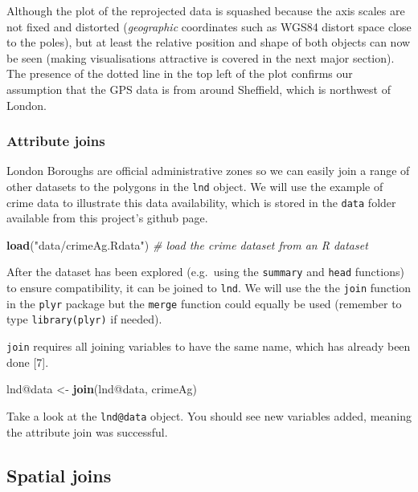 \documentclass[]{article}
\newenvironment{Shaded}{}{}
\newcommand{\KeywordTok}[1]{\textcolor[rgb]{0.00,0.44,0.13}{\textbf{{#1}}}}
\newcommand{\StringTok}[1]{\textcolor[rgb]{0.25,0.44,0.63}{{#1}}}
\newcommand{\CommentTok}[1]{\textcolor[rgb]{0.38,0.63,0.69}{\textit{{#1}}}}
\newcommand{\NormalTok}[1]{{#1}}
\begin{document}
Although the plot of the reprojected data is squashed because the axis
scales are not fixed and distorted (\emph{geographic} coordinates such
as WGS84 distort space close to the poles), but at least the relative
position and shape of both objects can now be seen (making
visualisations attractive is covered in the next major section). The
presence of the dotted line in the top left of the plot confirms our
assumption that the GPS data is from around Sheffield, which is
northwest of London.

\subsubsection{Attribute joins}

London Boroughs are official administrative zones so we can easily join
a range of other datasets to the polygons in the \texttt{lnd} object. We
will use the example of crime data to illustrate this data availability,
which is stored in the \texttt{data} folder available from this
project's github page.

\begin{Shaded}
\begin{Highlighting}[]
\KeywordTok{load}\NormalTok{(}\StringTok{"data/crimeAg.Rdata"}\NormalTok{)  }\CommentTok{# load the crime dataset from an R dataset}
\end{Highlighting}
\end{Shaded}
After the dataset has been explored (e.g.~using the \texttt{summary} and
\texttt{head} functions) to ensure compatibility, it can be joined to
\texttt{lnd}. We will use the the \texttt{join} function in the
\texttt{plyr} package but the \texttt{merge} function could equally be
used (remember to type \texttt{library(plyr)} if needed).

\texttt{join} requires all joining variables to have the same name,
which has already been done {[}7{]}.

\begin{Shaded}
\begin{Highlighting}[]
\NormalTok{lnd@data <- }\KeywordTok{join}\NormalTok{(lnd@data, crimeAg)}
\end{Highlighting}
\end{Shaded}
Take a look at the \texttt{lnd@data} object. You should see new
variables added, meaning the attribute join was successful.

\subsection{Spatial joins}
\end{document}
